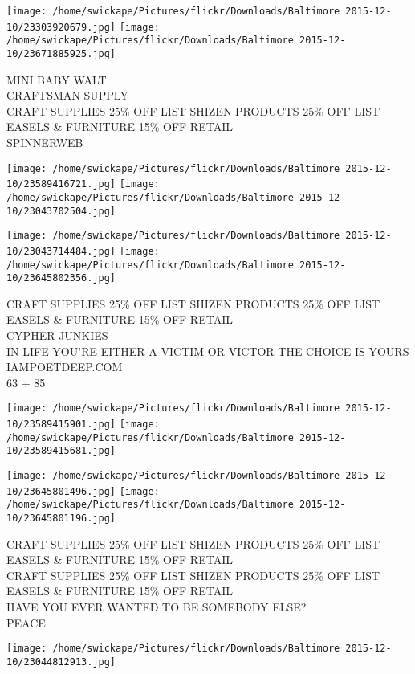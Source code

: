 \documentclass[10pt,letterpaper]{article}
\begin{document}
\texttt{[image: /home/swickape/Pictures/flickr/Downloads/Baltimore 2015-12-10/23303920679.jpg]}
\texttt{[image: /home/swickape/Pictures/flickr/Downloads/Baltimore 2015-12-10/23671885925.jpg]}

MINI BABY WALT\\
CRAFTSMAN SUPPLY\\
CRAFT SUPPLIES 25\% OFF LIST SHIZEN PRODUCTS 25\% OFF LIST EASELS \& FURNITURE 15\% OFF RETAIL\\
SPINNERWEB\\
\pagebreak

\texttt{[image: /home/swickape/Pictures/flickr/Downloads/Baltimore 2015-12-10/23589416721.jpg]}
\texttt{[image: /home/swickape/Pictures/flickr/Downloads/Baltimore 2015-12-10/23043702504.jpg]}

\texttt{[image: /home/swickape/Pictures/flickr/Downloads/Baltimore 2015-12-10/23043714484.jpg]}
\texttt{[image: /home/swickape/Pictures/flickr/Downloads/Baltimore 2015-12-10/23645802356.jpg]}

CRAFT SUPPLIES 25\% OFF LIST SHIZEN PRODUCTS 25\% OFF LIST EASELS \& FURNITURE 15\% OFF RETAIL\\
CYPHER JUNKIES\\
IN LIFE YOU'RE EITHER A VICTIM OR VICTOR THE CHOICE IS YOURS IAMPOETDEEP.COM\\
63 + 85\\
\pagebreak

\texttt{[image: /home/swickape/Pictures/flickr/Downloads/Baltimore 2015-12-10/23589415901.jpg]}
\texttt{[image: /home/swickape/Pictures/flickr/Downloads/Baltimore 2015-12-10/23589415681.jpg]}

\texttt{[image: /home/swickape/Pictures/flickr/Downloads/Baltimore 2015-12-10/23645801496.jpg]}
\texttt{[image: /home/swickape/Pictures/flickr/Downloads/Baltimore 2015-12-10/23645801196.jpg]}

CRAFT SUPPLIES 25\% OFF LIST SHIZEN PRODUCTS 25\% OFF LIST EASELS \& FURNITURE 15\% OFF RETAIL\\
CRAFT SUPPLIES 25\% OFF LIST SHIZEN PRODUCTS 25\% OFF LIST EASELS \& FURNITURE 15\% OFF RETAIL\\
HAVE YOU EVER WANTED TO BE SOMEBODY ELSE?\\
PEACE\\
\pagebreak

\texttt{[image: /home/swickape/Pictures/flickr/Downloads/Baltimore 2015-12-10/23044812913.jpg]}
\end{document}
